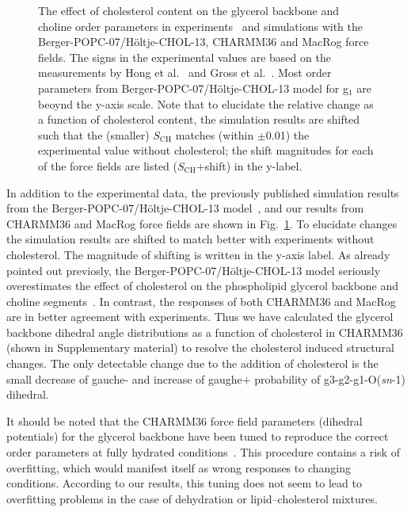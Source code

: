 \documentclass[journal=jacsat,manuscript=article]{achemso}
\begin{document}
\begin{figure}[]
  \caption{\label{ordPchol}
    The effect of cholesterol content on the glycerol backbone and choline order parameters in experiments~\cite{brown78,ferreira13} and simulations
    with the Berger-POPC-07/H\"oltje-CHOL-13, CHARMM36 and MacRog force fields. The signs in the experimental values are based on the measurements by Hong et al.~\cite{hong95a,hong95b} 
    and Gross et al.~\cite{gross97}.  Most order parameters from Berger-POPC-07/H\"oltje-CHOL-13 model for g$_1$ are beoynd the y-axis scale.
    Note that to elucidate the relative change as a function of cholesterol content,
    the simulation results are shifted such that the (smaller) $S_\mathrm{CH}$
    matches (within $\pm$0.01) the experimental value without cholesterol;
    the shift magnitudes for each of the force fields are listed ($S_\mathrm{CH}$+shift) in the y-label.
}
\end{figure}

In addition to the experimental data, the previously published simulation results from the Berger-POPC-07/H\"oltje-CHOL-13 model~\cite{ferreira13},
and our results from CHARMM36 and MacRog force fields are shown in Fig.~\ref{ordPchol}. 
To elucidate changes the simulation results are shifted to match better with experiments without cholesterol.
The magnitude of shifting is written in the y-axis label.
As already pointed out previosly, the Berger-POPC-07/H\"oltje-CHOL-13 model
seriously overestimates the effect of cholesterol on the phospholipid glycerol backbone and choline segments~\cite{ferreira13}.
In contrast, the responses of both CHARMM36 and MacRog are in better agreement with experiments. 
Thus we have calculated the glycerol backbone dihedral angle distributions
as a function of cholesterol in CHARMM36 (shown in Supplementary material) to resolve the cholesterol induced structural changes. The only detectable change due to the
addition of cholesterol is the small decrease of gauche- and increase of gaughe+ probability of g3-g2-g1-O(\textit{sn}-1) dihedral.


It should be noted that the CHARMM36 force field parameters (dihedral potentials) for the glycerol backbone have been tuned to reproduce the correct order parameters at fully hydrated conditions~\cite{klauda10}. 
This procedure contains a risk of overfitting, which would manifest itself as wrong responses to changing conditions. 
According to our results, this tuning does not seem to lead to overfitting problems in the case of dehydration or lipid--cholesterol mixtures. 
\end{document}
